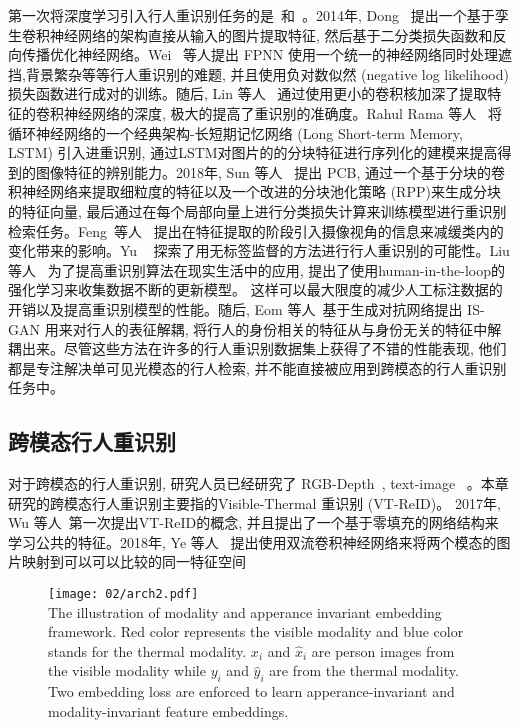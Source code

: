 第一次将深度学习引入行人重识别任务的是~\cite{yi2014deep}和~\cite{li2014deepreid}。2014年, Dong~\cite{yi2014deep} 提出一个基于孪生卷积神经网络的架构直接从输入的图片提取特征, 然后基于二分类损失函数和反向传播优化神经网络。Wei~\cite{li2014deepreid} 等人提出 FPNN 使用一个统一的神经网络同时处理遮挡,背景繁杂等等行人重识别的难题, 并且使用负对数似然 (negative log likelihood)损失函数进行成对的训练。随后, Lin 等人~\cite{wu2016personnet} 通过使用更小的卷积核加深了提取特征的卷积神经网络的深度, 极大的提高了重识别的准确度。Rahul Rama 等人~\cite{varior2016siamese} 将循环神经网络的一个经典架构-长短期记忆网络 (Long Short-term Memory, LSTM) 引入进重识别, 通过LSTM对图片的的分块特征进行序列化的建模来提高得到的图像特征的辨别能力。2018年, Sun 等人~\cite{sun2018beyond} 提出 PCB, 通过一个基于分块的卷积神经网络来提取细粒度的特征以及一个改进的分块池化策略 (RPP)来生成分块的特征向量, 最后通过在每个局部向量上进行分类损失计算来训练模型进行重识别检索任务。Feng~等人~\cite{feng2018learning} 提出在特征提取的阶段引入摄像视角的信息来减缓类内的变化带来的影响。Yu ~\cite{yu2019unsupervised} 探索了用无标签监督的方法进行行人重识别的可能性。Liu 等人~\cite{liu2019deep} 为了提高重识别算法在现实生活中的应用, 提出了使用human-in-the-loop的强化学习来收集数据不断的更新模型。 这样可以最大限度的减少人工标注数据的开销以及提高重识别模型的性能。随后, Eom 等人~\cite{eom2019learning}基于生成对抗网络提出 IS-GAN 用来对行人的表征解耦, 将行人的身份相关的特征从与身份无关的特征中解耦出来。尽管这些方法在许多的行人重识别数据集上获得了不错的性能表现, 他们都是专注解决单可见光模态的行人检索, 并不能直接被应用到跨模态的行人重识别任务中。
\subsection{跨模态行人重识别}
对于跨模态的行人重识别, 研究人员已经研究了 RGB-Depth~\cite{haque2016recurrent, munaro20143d, wu2017robust}, text-image ~\cite{li2017identity,li2017person,ye2015specific, yin2017adversarial}。本章研究的跨模态行人重识别主要指的Visible-Thermal 重识别 (VT-ReID)。 2017年, Wu 等人~\cite{wu2017rgb}第一次提出VT-ReID的概念, 并且提出了一个基于零填充的网络结构来学习公共的特征。2018年, Ye 等人~\cite{ye2018visible} 提出使用双流卷积神经网络来将两个模态的图片映射到可以可以比较的同一特征空间
\begin{figure}[!htp]
    \centering
    \texttt{[image: 02/arch2.pdf]} \\
      {The illustration of modality and apperance invariant embedding framework. Red color represents the visible modality and blue color stands for the thermal modality. $x_i$ and $\hat{x}_i$ are person images from the visible modality while $y_i$ and $\hat{y}_i$ are from the thermal modality. Two embedding loss are enforced to learn  apperance-invariant and modality-invariant feature embeddings.}   
      \label{fig:arch2}
\end{figure} 


